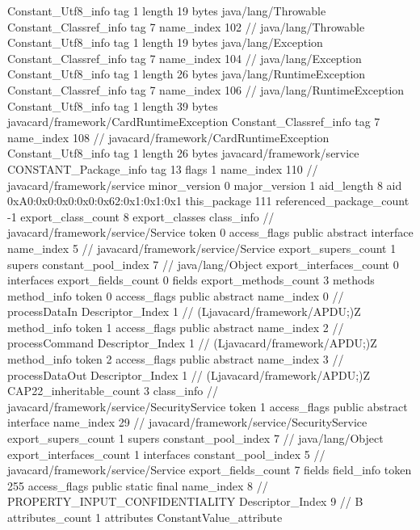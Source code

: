 {{{		}
		Constant_Utf8_info {
			tag	1
			length	19
			bytes	java/lang/Throwable
		}
		Constant_Classref_info {
			tag	7
			name_index	102		// java/lang/Throwable
		}
		Constant_Utf8_info {
			tag	1
			length	19
			bytes	java/lang/Exception
		}
		Constant_Classref_info {
			tag	7
			name_index	104		// java/lang/Exception
		}
		Constant_Utf8_info {
			tag	1
			length	26
			bytes	java/lang/RuntimeException
		}
		Constant_Classref_info {
			tag	7
			name_index	106		// java/lang/RuntimeException
		}
		Constant_Utf8_info {
			tag	1
			length	39
			bytes	javacard/framework/CardRuntimeException
		}
		Constant_Classref_info {
			tag	7
			name_index	108		// javacard/framework/CardRuntimeException
		}
		Constant_Utf8_info {
			tag	1
			length	26
			bytes	javacard/framework/service
		}
		CONSTANT_Package_info {
			tag	13
			flags	1
			name_index	110		// javacard/framework/service
			minor_version	0
			major_version	1
			aid_length	8
			aid	0xA0:0x0:0x0:0x0:0x62:0x1:0x1:0x1
		}
	}
	this_package	111
	referenced_package_count	-1
	export_class_count	8
	export_classes {
		class_info {		// javacard/framework/service/Service
			token	0
			access_flags	public abstract interface
			name_index	5		// javacard/framework/service/Service
			export_supers_count	1
			supers {
				constant_pool_index	7		// java/lang/Object
			}
			export_interfaces_count	0
			interfaces {
			}
			export_fields_count	0
			fields {
			}
			export_methods_count	3
			methods {
				method_info {
					token	0
					access_flags	public abstract
					name_index	0		// processDataIn
					Descriptor_Index	1		// (Ljavacard/framework/APDU;)Z
				}
				method_info {
					token	1
					access_flags	public abstract
					name_index	2		// processCommand
					Descriptor_Index	1		// (Ljavacard/framework/APDU;)Z
				}
				method_info {
					token	2
					access_flags	public abstract
					name_index	3		// processDataOut
					Descriptor_Index	1		// (Ljavacard/framework/APDU;)Z
				}
			}
			CAP22_inheritable_count	3
		}
		class_info {		// javacard/framework/service/SecurityService
			token	1
			access_flags	public abstract interface
			name_index	29		// javacard/framework/service/SecurityService
			export_supers_count	1
			supers {
				constant_pool_index	7		// java/lang/Object
			}
			export_interfaces_count	1
			interfaces {
				constant_pool_index	5		// javacard/framework/service/Service
			}
			export_fields_count	7
			fields {
			field_info {
				token	255
				access_flags	public static final
				name_index	8		// PROPERTY_INPUT_CONFIDENTIALITY
				Descriptor_Index	9		// B
				attributes_count	1
				attributes {
				ConstantValue_attribute {
}}}}}}}
